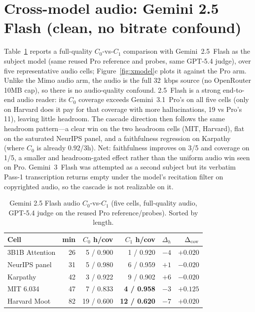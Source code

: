 \documentclass[11pt]{article}
\begin{document}
\section{Cross-model audio: Gemini 2.5 Flash (clean, no bitrate confound)}
\label{appdx:flash_audio}

Table~\ref{tab:flash_audio} reports a full-quality $C_0$-vs-$C_1$ comparison with Gemini~2.5~Flash as the subject model (same reused Pro reference and probes, same GPT-5.4 judge), over five representative audio cells; Figure~\ref{fig:xmodel}c plots it against the Pro arm. Unlike the Mimo audio arm, the audio is the full 32~kbps source (no OpenRouter 10MB cap), so there is no audio-quality confound. 2.5~Flash is a strong end-to-end audio reader: its $C_0$ coverage exceeds Gemini~3.1~Pro's on all five cells (only on Harvard does it pay for that coverage with more hallucinations, 19 vs Pro's 11), leaving little headroom. The cascade direction then follows the same headroom pattern---a clear win on the two headroom cells (MIT, Harvard), flat on the saturated NeurIPS panel, and a faithfulness regression on Karpathy (where $C_0$ is already $0.92$/3h). Net: faithfulness improves on 3/5 and coverage on 1/5, a smaller and headroom-gated effect rather than the uniform audio win seen on Pro. Gemini~3~Flash was attempted as a second subject but its verbatim Pass-1 transcription returns empty under the model's recitation filter on copyrighted audio, so the cascade is not realizable on it.

\begin{table}[h]
\centering
\small
\caption{Gemini 2.5 Flash audio $C_0$-vs-$C_1$ (five cells, full-quality audio, GPT-5.4 judge on the reused Pro reference/probes). Sorted by length.}
\label{tab:flash_audio}
\begin{tabular}{lrrrrr}
\toprule
Cell & min & $C_0$ h/cov & $C_1$ h/cov & $\Delta_h$ & $\Delta_{\rm cov}$ \\
\midrule
3B1B Attention & 26 & 5 / 0.900  & 1 / 0.920  & $-4$ & $+0.020$ \\
NeurIPS panel  & 31 & 5 / 0.980  & 6 / 0.959  & $+1$ & $-0.020$ \\
Karpathy       & 42 & 3 / 0.922  & 9 / 0.902  & $+6$ & $-0.020$ \\
MIT 6.034      & 47 & 7 / 0.833  & \textbf{4 / 0.958} & $-3$ & $+0.125$ \\
Harvard Moot   & 82 & 19 / 0.600 & \textbf{12 / 0.620} & $-7$ & $+0.020$ \\
\bottomrule
\end{tabular}
\end{table}
\end{document}
